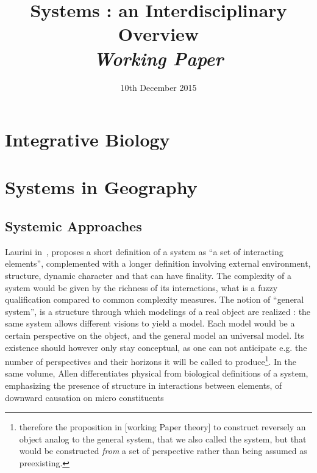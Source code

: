 


\title{Systems : an Interdisciplinary Overview\bigskip\\
\textit{Working Paper}
}
\author{}
\date{10th December 2015}


\maketitle

\justify


\begin{abstract}

\end{abstract}






\section{Integrative Biology}




\section{Systems in Geography}

\subsection{Systemic Approaches}


Laurini in~\cite{guermond1983techniques}, proposes a short definition of a system as ``a set of interacting elements'', complemented with a longer definition involving external environment, structure, dynamic character and that can have finality. The complexity of a system would be given by the richness of its interactions, what is a fuzzy qualification compared to common complexity measures. The notion of ``general system'', is a structure through which modelings of a real object are realized : the same system allows different visions to yield a model. Each model would be a certain perspective on the object, and the general model an universal model. Its existence should however only stay conceptual, as one can not anticipate e.g. the number of perspectives and their horizons it will be called to produce\footnote{therefore the proposition in [working Paper theory] to construct reversely an object analog to the general system, that we also called the system, but that would be constructed \emph{from} a set of perspective rather than being assumed as preexisting.}. In the same volume, Allen differentiates physical from biological definitions of a system, emphasizing the presence of structure in interactions between elements, of downward causation on micro constituents 


